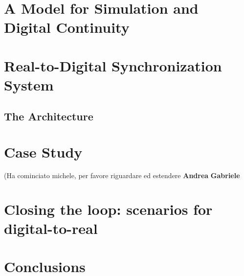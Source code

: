 \documentclass{riverk}
\begin{document}
\section{A Model for Simulation and Digital Continuity}\label{sec:model}




\section{Real-to-Digital Synchronization System}


\subsection{The Architecture}\label{sec:architecture}




\section{Case Study}\label{sec:caseStudy}
(Ha cominciato michele, per favore riguardare ed estendere \textbf{Andrea} \textbf{Gabriele}


\section{Closing the loop: scenarios for digital-to-real}


\section{Conclusions}







\end{document}
